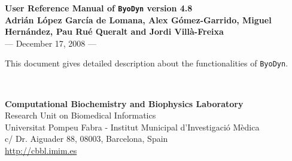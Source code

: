 \documentclass[a4paper, 11pt]{article}
\begin{document}
\begin{center}
  \thispagestyle{empty}
  \textbf{\Large{User Reference Manual of \texttt{ByoDyn} version 4.8}}\\[5ex]
  \textbf{Adri\'an L\'opez Garc\'ia de Lomana, Alex G\'omez-Garrido, Miguel Hern\'andez, Pau Ru\'e Queralt and Jordi Vill\`a-Freixa}\\[10ex] --- December 17, 2008 ---\\[10ex]
  \parbox{0.70\linewidth}{
    This document gives detailed description about the functionalities of \texttt{ByoDyn}. 
  }\\[60ex]
\end{center}
\begin{footnotesize}
  \begin{raggedleft}
    \textbf{Computational Biochemistry and Biophysics Laboratory}\\
    Research Unit on Biomedical Informatics\\
    Universitat Pompeu Fabra - Institut Municipal d'Investigaci\'o M\`edica\\
    c/ Dr. Aiguader 88, 08003, Barcelona, Spain\\
    \url{http://cbbl.imim.es}\\
  \end{raggedleft}
\end{footnotesize}
\newpage
\tableofcontents
\newpage
\end{document}
